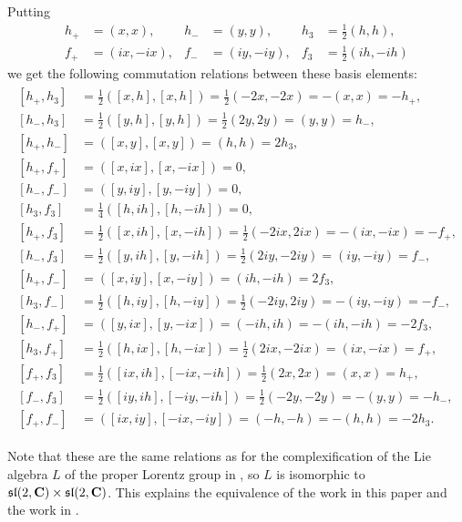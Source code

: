 Putting
\begin{align*}
  h_+&=(x,x), & h_-&=(y,y), & h_3&=\tfrac{1}{2}(h,h), \\
  f_+&=(ix,-ix), & f_-&=(iy,-iy),&  f_3&=\tfrac{1}{2}(ih,-ih)
\end{align*}
we get the following commutation relations between these basis elements:
\begin{align}
  \begin{split}
    [h_+,h_3] &= \tfrac{1}{2}([x,h],[x,h]) = \tfrac{1}{2}(-2x,-2x) = -(x,x) = -h_+, \label{eq:lierels} \\
    [h_-,h_3] &= \tfrac{1}{2}([y,h],[y,h]) = \tfrac{1}{2}(2y,2y) = (y,y) = h_-, \\
    [h_+,h_-] &= ([x,y],[x,y]) = (h,h) = 2h_3, \\
    [h_+,f_+] &= ([x,ix],[x,-ix]) = 0, \\
    [h_-,f_-] &= ([y,iy],[y,-iy]) = 0, \\
    [h_3,f_3] &= \tfrac{1}{4}([h,ih],[h,-ih]) = 0, \\
    [h_+,f_3] &= \tfrac{1}{2}([x,ih],[x,-ih]) = \tfrac{1}{2}(-2ix,2ix) = -(ix,-ix) = -f_+, \\
    [h_-,f_3] &= \tfrac{1}{2}([y,ih],[y,-ih]) = \tfrac{1}{2}(2iy,-2iy) = (iy,-iy) = f_-, \\
    [h_+,f_-] &= ([x,iy],[x,-iy]) = (ih,-ih) = 2f_3, \\
    [h_3,f_-] &= \tfrac{1}{2}([h,iy],[h,-iy]) = \tfrac{1}{2}(-2iy,2iy) = -(iy,-iy) = -f_-, \\
    [h_-,f_+] &= ([y,ix],[y,-ix]) = (-ih,ih) = -(ih,-ih) = -2f_3, \\
    [h_3,f_+] &= \tfrac{1}{2}([h,ix],[h,-ix]) = \tfrac{1}{2}(2ix,-2ix) = (ix,-ix) = f_+, \\
    [f_+,f_3] &= \tfrac{1}{2}([ix,ih],[-ix,-ih]) = \tfrac{1}{2}(2x,2x) = (x,x) = h_+, \\
    [f_-,f_3] &= \tfrac{1}{2}([iy,ih],[-iy,-ih]) = \tfrac{1}{2}(-2y,-2y) = -(y,y) = -h_-, \\
    [f_+,f_-] &= ([ix,iy],[-ix,-iy]) = (-h,-h) = -(h,h) = -2h_3.
  \end{split}
\end{align}

\begin{remark}
  Note that these are the same relations as for the complexification of the Lie algebra $L$ of the proper Lorentz group in \cite[5]{indecompReprOfLorGr}, so $L$ is isomorphic to $\mathfrak{sl}(2,\mathbf{C})\times \mathfrak{sl}(2,\mathbf{C})$. This explains the equivalence of the work in this paper and the work in \cite{classifOfIndec,catOfHarChaMod,indecompReprOfLorGr}.
\end{remark}

